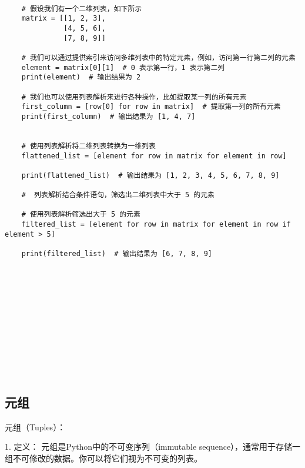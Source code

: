 \documentclass{article}
\begin{document}
\begin{lstlisting}[caption={示例Python代码}]

    # 假设我们有一个二维列表，如下所示
    matrix = [[1, 2, 3],
              [4, 5, 6],
              [7, 8, 9]]
    
    # 我们可以通过提供索引来访问多维列表中的特定元素，例如，访问第一行第二列的元素
    element = matrix[0][1]  # 0 表示第一行，1 表示第二列
    print(element)  # 输出结果为 2
    
    # 我们也可以使用列表解析来进行各种操作，比如提取某一列的所有元素
    first_column = [row[0] for row in matrix]  # 提取第一列的所有元素
    print(first_column)  # 输出结果为 [1, 4, 7]
    

    # 使用列表解析将二维列表转换为一维列表
    flattened_list = [element for row in matrix for element in row]
    
    print(flattened_list)  # 输出结果为 [1, 2, 3, 4, 5, 6, 7, 8, 9]
    
    #  列表解析结合条件语句，筛选出二维列表中大于 5 的元素
    
    # 使用列表解析筛选出大于 5 的元素
    filtered_list = [element for row in matrix for element in row if element > 5]
    
    print(filtered_list)  # 输出结果为 [6, 7, 8, 9]













\end{lstlisting}
    


\subsection{元组}
元组（Tuples）：

1. 定义：
元组是Python中的不可变序列（immutable sequence），通常用于存储一组不可修改的数据。你可以将它们视为不可变的列表。
\end{document}
